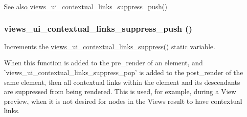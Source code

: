 \begin{DoxySeeAlso}{See also}
\hyperlink{views__ui_8module_a7532104e55cf66b4dbadfd526bae61e3}{views\_\-ui\_\-contextual\_\-links\_\-suppress\_\-push()} 
\end{DoxySeeAlso}
\hypertarget{views__ui_8module_a7532104e55cf66b4dbadfd526bae61e3}{
\subsubsection[{views\_\-ui\_\-contextual\_\-links\_\-suppress\_\-push}]{\setlength{\rightskip}{0pt plus 5cm}views\_\-ui\_\-contextual\_\-links\_\-suppress\_\-push ()}}
\label{views__ui_8module_a7532104e55cf66b4dbadfd526bae61e3}
Increments the \hyperlink{views__ui_8module_a5260e8015954411b641445a3389dd5ce}{views\_\-ui\_\-contextual\_\-links\_\-suppress()} static variable.

When this function is added to the pre\_\-render of an element, and 'views\_\-ui\_\-contextual\_\-links\_\-suppress\_\-pop' is added to the post\_\-render of the same element, then all contextual links within the element and its descendants are suppressed from being rendered. This is used, for example, during a View preview, when it is not desired for nodes in the Views result to have contextual links.

